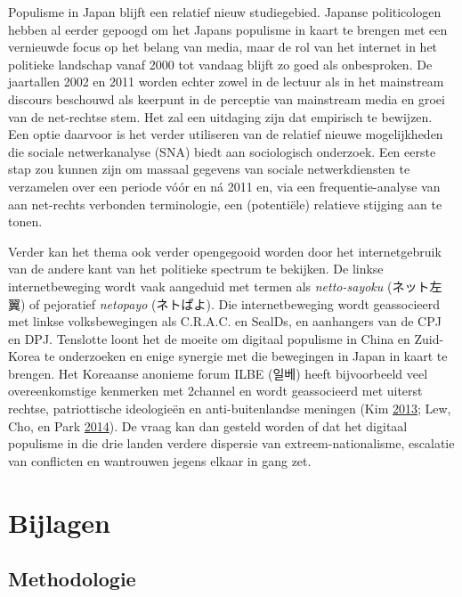 \documentclass[10.5pt,dutch,]{article}
\begin{document}
Populisme in Japan blijft een relatief nieuw studiegebied. Japanse
politicologen hebben al eerder gepoogd om het Japans populisme in kaart
te brengen met een vernieuwde focus op het belang van media, maar de rol
van het internet in het politieke landschap vanaf 2000 tot vandaag
blijft zo goed als onbesproken. De jaartallen 2002 en 2011 worden echter
zowel in de lectuur als in het mainstream discours beschouwd als
keerpunt in de perceptie van mainstream media en groei van de net-rechtse stem. Het zal een uitdaging zijn dat empirisch te bewijzen. Een
optie daarvoor is het verder utiliseren van de relatief nieuwe
mogelijkheden die sociale netwerkanalyse (SNA) biedt aan sociologisch
onderzoek. Een eerste stap zou kunnen zijn om massaal gegevens van
sociale netwerkdiensten te verzamelen over een periode vóór en ná 2011
en, via een frequentie-analyse van aan net-rechts verbonden
terminologie, een (potentiële) relatieve stijging aan te tonen.

Verder kan het thema ook verder opengegooid worden door het
internetgebruik van de andere kant van het politieke spectrum te
bekijken. De linkse internetbeweging wordt vaak aangeduid met termen als
\emph{netto-sayoku} (ネット左翼) of pejoratief \emph{netopayo}
(ネトぱよ). Die internetbeweging wordt geassocieerd met linkse
volksbewegingen als C.R.A.C. en SealDs, en aanhangers van de CPJ en DPJ.
Tenslotte loont het de moeite om digitaal populisme in China en
Zuid-Korea te onderzoeken en enige synergie met die bewegingen in Japan
in kaart te brengen. Het Koreaanse anonieme forum ILBE (일베) heeft
bijvoorbeeld veel overeenkomstige kenmerken met 2channel en wordt
geassocieerd met uiterst rechtse, patriottische ideologieën en
anti-buitenlandse meningen (Kim
\protect\hyperlink{ref-kimux5filbeux5f2013}{2013}; Lew, Cho, en Park
\protect\hyperlink{ref-lewux5fpoliticizationux5f2014}{2014}). De vraag
kan dan gesteld worden of dat het digitaal populisme in die drie landen
verdere dispersie van extreem-nationalisme, escalatie van conflicten en
wantrouwen jegens elkaar in gang zet.

\newpage

\appendix

\section{Bijlagen}\label{bijlagen}

\subsection{Methodologie}\label{methodologie}
\end{document}
